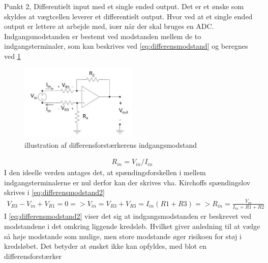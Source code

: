 Punkt 2, Differentielt input med et single ended output. Det er et ønske som skyldes at vægtcellen leverer et differentielt output. Hvor ved at et single ended output er lettere at arbejde med, især når der skal bruges en ADC. Indgangsmodstanden er bestemt ved modstanden mellem de to indgangsterminaler, som kan beskrives ved \ref{eq:differensmodstand} og beregnes ved \ref{fig:differensmodstand}
\begin{figure}[H]
	\centering
	\includegraphics[width=0.5\textwidth]{billeder/Hardware/differensmodstand.JPG}
	\caption{illustration af differensforstærkerens indgangsmodstand}
	\label{fig:differensmodstand}
\end{figure}
\begin{align}
 R_{in} =V_{in}/I_{in}
 \label{eq:differensmodstand}
 \end{align}
I den ideelle verden antages det, at spændingsforskellen i mellem indgangsterminalerne er nul derfor kan der skrives vha. Kirchoffs spændingslov skrives i \ref{eq:differensmodstand2}
\begin{align}
 V_{R3}-V_{in}+V_{R1}=0=>V_{in}=V_{R3}+V_{R3}=I_{in}(R1+R3)=>R_{in}=\frac{V_{in}}{I_{in}=R1+R2}
 \label{eq:differensmodstand2}
 \end{align}
 I \ref{eq:differensmodstand2} viser det sig at indgangsmodstanden er beskrevet ved modstandene i det omkring liggende kredsløb. Hvilket giver anledning til at vælge så høje modstande som mulige, men store modstande øger risikoen for støj i kredsløbet. Det betyder at ønsket ikke kan opfyldes, med blot en differensforstærker


